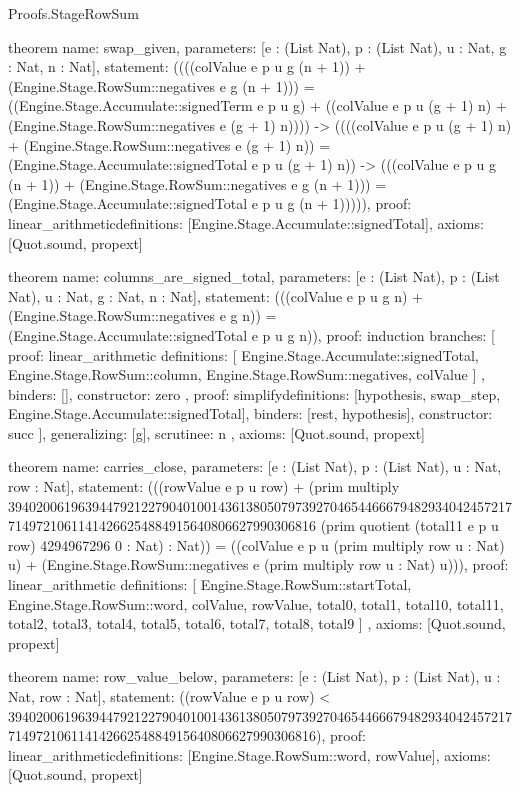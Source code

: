 \begin{lexlean}{Proofs.StageRowSum}
\begin{semanticmodule}
theorem{
  name: swap_given,
  parameters: [e : (List Nat), p : (List Nat), u : Nat, g : Nat, n : Nat],
  statement: ((((colValue e p u g (n + 1)) + (Engine.Stage.RowSum::negatives e g (n + 1))) = ((Engine.Stage.Accumulate::signedTerm e p u g) + ((colValue e p u (g + 1) n) + (Engine.Stage.RowSum::negatives e (g + 1) n)))) -> ((((colValue e p u (g + 1) n) + (Engine.Stage.RowSum::negatives e (g + 1) n)) = (Engine.Stage.Accumulate::signedTotal e p u (g + 1) n)) -> (((colValue e p u g (n + 1)) + (Engine.Stage.RowSum::negatives e g (n + 1))) = (Engine.Stage.Accumulate::signedTotal e p u g (n + 1))))),
  proof: linear_arithmetic{definitions: [Engine.Stage.Accumulate::signedTotal]},
  axioms: [Quot.sound, propext]
}

theorem{
  name: columns_are_signed_total,
  parameters: [e : (List Nat), p : (List Nat), u : Nat, g : Nat, n : Nat],
  statement: (((colValue e p u g n) + (Engine.Stage.RowSum::negatives e g n)) = (Engine.Stage.Accumulate::signedTotal e p u g n)),
  proof: induction{
    branches: [
      {
        proof: linear_arithmetic{
          definitions: [
            Engine.Stage.Accumulate::signedTotal,
            Engine.Stage.RowSum::column,
            Engine.Stage.RowSum::negatives,
            colValue
          ]
        },
        binders: [],
        constructor: zero
      },
      {
        proof: simplify{definitions: [hypothesis, swap_step, Engine.Stage.Accumulate::signedTotal]},
        binders: [rest, hypothesis],
        constructor: succ
      }
    ],
    generalizing: [g],
    scrutinee: n
  },
  axioms: [Quot.sound, propext]
}

theorem{
  name: carries_close,
  parameters: [e : (List Nat), p : (List Nat), u : Nat, row : Nat],
  statement: (((rowValue e p u row) + (prim multiply 39402006196394479212279040100143613805079739270465446667948293404245721771497210611414266254884915640806627990306816 (prim quotient (total11 e p u row) 4294967296 0 : Nat) : Nat)) = ((colValue e p u (prim multiply row u : Nat) u) + (Engine.Stage.RowSum::negatives e (prim multiply row u : Nat) u))),
  proof: linear_arithmetic{
    definitions: [
      Engine.Stage.RowSum::startTotal,
      Engine.Stage.RowSum::word,
      colValue,
      rowValue,
      total0,
      total1,
      total10,
      total11,
      total2,
      total3,
      total4,
      total5,
      total6,
      total7,
      total8,
      total9
    ]
  },
  axioms: [Quot.sound, propext]
}

theorem{
  name: row_value_below,
  parameters: [e : (List Nat), p : (List Nat), u : Nat, row : Nat],
  statement: ((rowValue e p u row) < 39402006196394479212279040100143613805079739270465446667948293404245721771497210611414266254884915640806627990306816),
  proof: linear_arithmetic{definitions: [Engine.Stage.RowSum::word, rowValue]},
  axioms: [Quot.sound, propext]
}


\end{semanticmodule}
\end{lexlean}
